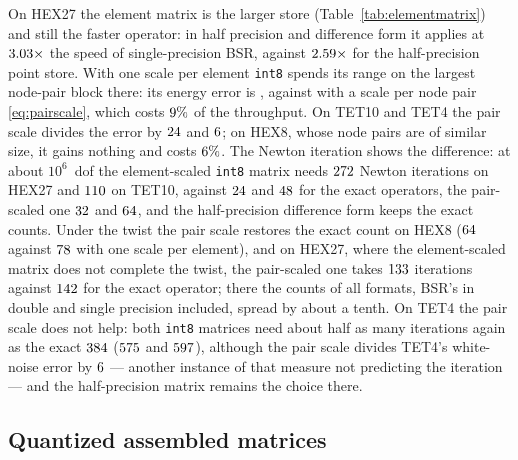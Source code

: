 \documentclass[sigconf,balance=false]{acmart}
\begin{document}
On HEX27 the element matrix is the larger store (Table~\ref{tab:elementmatrix}) and still the faster
operator: in half precision and difference form it applies at
$3.03\times$ the speed of single-precision BSR, against
$2.59\times$ for the half-precision point store.  With one scale per element
\texttt{int8} spends its range on the largest node-pair block there: its energy error is
\errEaDiffEightHexTwentySeven{}, against \errEaPairEightHexTwentySeven{} with a scale per node pair
\eqref{eq:pairscale}, which costs $9\%$ of the throughput.  On TET10 and
TET4 the pair scale divides the error by $24$ and $6$; on HEX8, whose
node pairs are of similar size, it gains nothing and costs $6\%$.  The Newton
iteration shows the difference: at about $10^6$~dof the element-scaled \texttt{int8} matrix needs
$272$ Newton iterations on HEX27 and $110$ on TET10,
against $24$ and $48$ for the exact operators, the
pair-scaled one $32$ and $64$, and the
half-precision difference form keeps the exact counts.  Under the twist the pair scale restores the
exact count on HEX8 ($64$ against $78$ with one scale per
element), and on HEX27, where the element-scaled matrix does not complete the twist, the pair-scaled
one takes $133$ iterations against $142$ for the
exact operator; there the counts of all formats, BSR's in double and single precision included,
spread by about a tenth.  On TET4 the pair scale does not help: both \texttt{int8} matrices need
about half as many iterations again as the exact $384$ ($575$ and
$597$), although the pair scale divides TET4's white-noise error by
$6$ --- another instance of that measure not predicting the iteration --- and the
half-precision matrix remains the choice there.

\subsection{Quantized assembled matrices}
\end{document}

